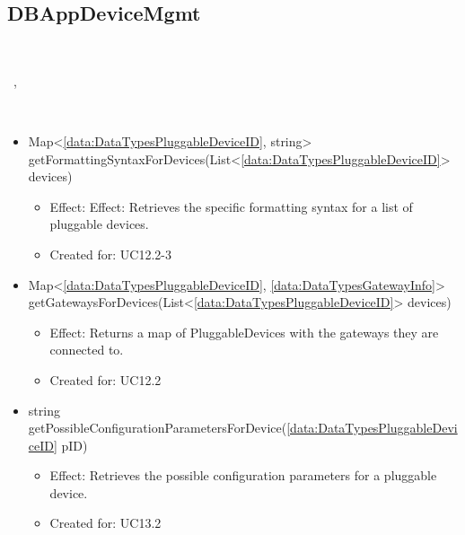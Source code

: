   \subsection{DBAppDeviceMgmt}\label{int:DeviceDatabaseDeviceDBDBAppDeviceMgmt}
    \begin{description}
      \item[Provided by:] \iconcomponent{}~
      \item[Required by:] \iconcomponent{}~, \iconcomponent{}~
      \item[Operations:] ~
    \begin{itemize}[noitemsep,nolistsep,leftmargin=-.25cm]
      \item \textsf{Map\textless{}\ref{data:DataTypesPluggableDeviceID}, string\textgreater{} getFormattingSyntaxForDevices(List\textless{}\ref{data:DataTypesPluggableDeviceID}\textgreater{} devices)}
        \begin{itemize}[noitemsep,nolistsep]
           \item Effect: Effect: Retrieves the specific formatting syntax for a list of pluggable devices.
\item Created for: UC12.2-3
        \end{itemize}
      \item \textsf{Map\textless{}\ref{data:DataTypesPluggableDeviceID}, \ref{data:DataTypesGatewayInfo}\textgreater{} getGatewaysForDevices(List\textless{}\ref{data:DataTypesPluggableDeviceID}\textgreater{} devices)}
        \begin{itemize}[noitemsep,nolistsep]
           \item Effect: Returns a map of PluggableDevices with the gateways they are connected to.
\item Created for: UC12.2
        \end{itemize}
      \item \textsf{string getPossibleConfigurationParametersForDevice(\ref{data:DataTypesPluggableDeviceID} pID)}
        \begin{itemize}[noitemsep,nolistsep]
           \item Effect: Retrieves the possible configuration parameters for a pluggable device.
\item Created for: UC13.2
        \end{itemize}
    \end{itemize}
    \end{description}

